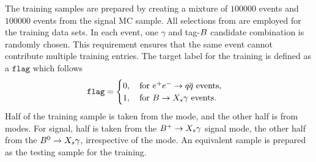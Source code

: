 The training samples are prepared by creating a mixture of $100 000$ \epem\ra\qqbar events and $100 000$ \BtoXsgamma events from the signal MC sample.
All selections from  are employed for the training data sets.
In each event, one $\gamma$ and tag-$B$ candidate combination is randomly chosen.
This requirement ensures that the same event cannot contribute multiple training entries.
The target label for the training is defined as a $\mathtt{flag}$ which follows
\begin{equation}
    \mathtt{flag}=\begin{cases}
      0,\quad \mathrm{for}~\epem\ra\qqbar~\mathrm{events},\\ 
      1,\quad \mathrm{for}~\BtoXsgamma~\mathrm{events}.
      \end{cases}
\end{equation}
Half of the \epem\ra\qqbar training sample is taken from the \feiBp mode, and the other half is from \feiBz modes. 
For signal, half is taken from the $\BptoXsgamma$ signal mode, the other half from the $\BztoXsgamma$, irrespective of the \FEI mode.
An equivalent sample is prepared as the testing sample for the training.

